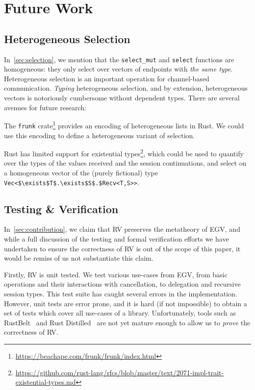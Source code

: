 \documentclass[copyright,creativecommons]{eptcs}
\begin{document}
\section{Future Work}\label{sec:future-work}

\subsection{Heterogeneous Selection}
In~\cref{sec:selection}, we mention that the \lstinline{select_mut} and \lstinline{select} functions are homogeneous: they only select over vectors of endpoints with \emph{the same type}. Heterogeneous selection is an important operation for channel-based communication. \emph{Typing} heterogeneous selection, and by extension, heterogeneous vectors is notoriously cumbersome without dependent types. There are several avenues for future research:

The \lstinline{frunk} crate\footnote{\url{https://beachape.com/frunk/frunk/index.html}} provides an encoding of heterogeneous lists in Rust. We could use this encoding to define a heterogeneous variant of selection.

Rust has limited support for existential types\footnote{\url{https://github.com/rust-lang/rfcs/blob/master/text/2071-impl-trait-existential-types.md}}, which could be used to quantify over the types of the values received and the session continuations, and select on a homogeneous vector of the (purely fictional) type \lstinline[mathescape=true]{Vec<$\exists$T$.\exists$S$.$Recv<T,S>>}.

\subsection{Testing \& Verification}\label{sec:verification}
In~\cref{sec:contribution}, we claim that RV preserves the metatheory of EGV, and while a full discussion of the testing and formal verification efforts we have undertaken to ensure the correctness of RV is out of the scope of this paper, it would be remiss of us not substantiate this claim.

Firstly, RV is unit tested. We test various use-cases from EGV, from basic operations and their interactions with cancellation, to delegation and recursive session types. This test suite has caught several errors in the implementation. However, unit tests are error prone, and it is hard (if not impossible) to obtain a set of tests which cover all use-cases of a library. Unfortunately, tools such as RustBelt~\cite{jung2017} and Rust Distilled~\cite{weiss2018} are not yet mature enough to allow us to \emph{prove} the correctness of RV.
\end{document}
